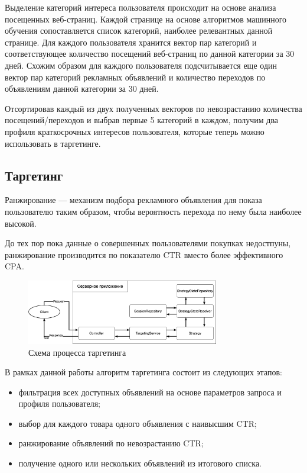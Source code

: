 \documentclass[specification,annotation,times]{itmo-student-thesis}
\begin{document}
 Выделение категорий интереса пользователя происходит на основе анализа посещенных веб-страниц. Каждой странице на основе алгоритмов машинного обучения сопоставляется список категорий, наиболее релевантных данной странице. Для каждого пользователя хранится вектор пар категорий и соответствующее количество посещений веб-страниц по данной категории за 30 дней. Схожим образом для каждого пользователя подсчитывается еще один вектор пар категорий рекламных объявлений и количество переходов по объявлениям данной категории за 30 дней.
 
Отсортировав каждый из двух полученных векторов по невозрастанию количества посещений/переходов  и выбрав первые 5 категорий в каждом, получим два профиля краткосрочных интересов пользователя, которые теперь можно использовать в таргетинге.

\subsection{Таргетинг}

Ранжирование — механизм подбора рекламного объявления для показа пользователю таким образом, чтобы вероятность перехода по нему была наиболее высокой.

До тех пор пока данные о совершенных пользователями покупках недостпуны, ранжирование производится по показателю CTR вместо более эффективного CPA.

\begin{figure}[h]
\caption{Схема процесса таргетинга}
\includegraphics[width=0.75\textwidth]{targeting-process}
\centering
\end{figure}

В рамках данной работы алгоритм таргетинга состоит из следующих этапов:
\begin{itemize}
\item фильтрация всех доступных объявлений на основе параметров запроса и профиля пользователя;
\item выбор для каждого товара одного объявления с наивысшим CTR;
\item ранжирование объявлений по невозрастанию CTR;
\item получение одного или нескольких объявлений из итогового списка.
\end{itemize}
\end{document}
